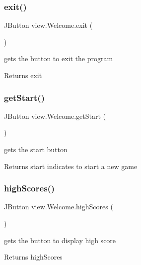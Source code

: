 \subsubsection{\texorpdfstring{exit()}{exit()}}
{\footnotesize\ttfamily J\+Button view.\+Welcome.\+exit (\begin{DoxyParamCaption}{ }\end{DoxyParamCaption})}



gets the button to exit the program 

\begin{DoxyReturn}{Returns}
exit 
\end{DoxyReturn}
\hypertarget{classview_1_1_welcome_a8375f9965fb6662e612ea02af51a51a9}{}\label{classview_1_1_welcome_a8375f9965fb6662e612ea02af51a51a9} 
\subsubsection{\texorpdfstring{get\+Start()}{getStart()}}
{\footnotesize\ttfamily J\+Button view.\+Welcome.\+get\+Start (\begin{DoxyParamCaption}{ }\end{DoxyParamCaption})}



gets the start button 

\begin{DoxyReturn}{Returns}
start indicates to start a new game 
\end{DoxyReturn}
\hypertarget{classview_1_1_welcome_a5d23e93f1a81a2520d5635ed7d8d5920}{}\label{classview_1_1_welcome_a5d23e93f1a81a2520d5635ed7d8d5920} 
\subsubsection{\texorpdfstring{high\+Scores()}{highScores()}}
{\footnotesize\ttfamily J\+Button view.\+Welcome.\+high\+Scores (\begin{DoxyParamCaption}{ }\end{DoxyParamCaption})}



gets the button to display high score 

\begin{DoxyReturn}{Returns}
high\+Scores 
\end{DoxyReturn}
\hypertarget{classview_1_1_welcome_a4a6c30be81cc7a3b081d3e97a4c84356}{}\label{classview_1_1_welcome_a4a6c30be81cc7a3b081d3e97a4c84356} 
